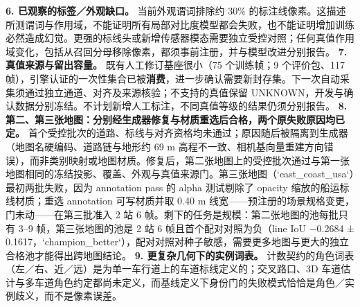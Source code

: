 \documentclass[journal]{IEEEtran}
\begin{document}
\textbf{6. 已观察的标签／外观缺口。} 当前外观谓词排除约 30\% 的标注线像素。这描述所测谓词与作用域，不能证明所有局部对比度模型都会失败，也不能证明增加训练必然造成幻觉。更强的标线头或新增传感器模态需要独立受控对照；任何真值作用域变化，包括从召回分母移除像素，都须事前注册，并与模型改进分别报告。
\textbf{7. 真值来源与留出容量。} 既有人工修订基座很小（75 个训练帧；9 个评价包、117 帧），引擎认证的一次性集合已被\textbf{消费}，进一步确认需要新封存集。下一次自动采集须通过独立通道、对齐及来源核验；不支持的真值保留 UNKNOWN，开发与确认数据分别冻结。不计划新增人工标注，不同真值等级的结果仍须分别报告。
\textbf{8. 第二、第三张地图：分别经生成器修复与材质重选后合格，两个原失败原因均已定。} 首个受控批次的道路、标线与对齐资格均未通过；原因随后被隔离到生成器（地图名硬编码、道路链与地形约 69 m 高程不一致、相机基向量重建方向错误），而非类别映射或地图材质。修复后，第二张地图上的受控批次通过与第一张地图相同的冻结投影、覆盖、外观与真值来源门。第三张地图（`east_coast_usa`）最初两批失败，因为 annotation pass 的 alpha 测试剔除了 opacity 缩放的船运标线材质；重选 annotation 可写材质并取 0.40 m 线宽------预注册的场景规格变更，门未动------在第三批准入 2 站 6 帧。剩下的任务是规模：第二张地图的池每批只有 3--9 帧，第三张地图的池是 2 站 6 帧且首个配对对照为负（line IoU −0.2684 ± 0.1617，`champion_better`），配对对照对种子敏感，需要更多地图与更大的独立合格池才能得出跨地图结论。
\textbf{9. 更复杂几何下的实例词表。} 计数契约的角色词表（左／右、近／远）是为单一车行道上的车道标线定义的；交叉路口、3D 车道估计与多车道角色约定都尚未定义，而基线定义下身份门的失败模式恰恰是角色／实例歧义，而不是像素误差。
\end{document}
